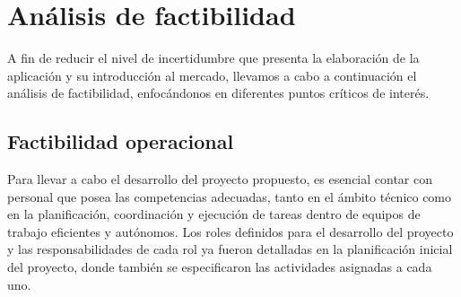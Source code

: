 \documentclass[a4paper,12pt]{article}
\begin{document}
    \section{Análisis de factibilidad}
    \par A fin de reducir el nivel de incertidumbre que presenta la elaboración de la aplicación y su introducción al mercado, llevamos a cabo a continuación el análisis de factibilidad, enfocándonos en diferentes puntos críticos de interés.
    \subsection{Factibilidad operacional}
    \par Para llevar a cabo el desarrollo del proyecto propuesto, es esencial contar con personal que posea las competencias adecuadas, tanto en el ámbito técnico como en la planificación, coordinación y ejecución de tareas dentro de equipos de trabajo eficientes y autónomos. Los roles definidos para el desarrollo del proyecto y las responsabilidades de cada rol ya fueron detalladas en la planificación inicial del proyecto, donde también se especificaron las actividades asignadas a cada uno.
\end{document}
